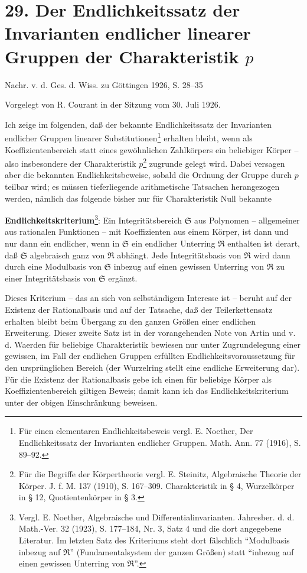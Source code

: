 ﻿\section*{29. Der Endlichkeitssatz der Invarianten endlicher linearer Gruppen der Charakteristik $p$}

\begin{center}
Nachr. v. d. Ges. d. Wiss. zu Göttingen 1926, S. 28--35
\end{center}

Vorgelegt von R. Courant in der Sitzung vom 30. Juli 1926.

Ich zeige im folgenden, daß der bekannte Endlichkeitssatz der Invarianten endlicher Gruppen linearer Substitutionen\footnote{Für einen elementaren Endlichkeitsbeweis vergl. E. Noether, Der Endlichkeitssatz der Invarianten endlicher Gruppen. Math. Ann. 77 (1916), S. 89--92.} erhalten bleibt, wenn als Koeffizientenbereich statt eines gewöhnlichen Zahlkörpers ein beliebiger Körper -- also insbesondere der Charakteristik $p$\footnote{Für die Begriffe der Körpertheorie vergl. E. Steinitz, Algebraische Theorie der Körper. J. f. M. 137 (1910), S. 167--309. Charakteristik in § 4, Wurzelkörper in § 12, Quotientenkörper in § 3.} zugrunde gelegt wird. Dabei versagen aber die bekannten Endlichkeitsbeweise, sobald die Ordnung der Gruppe durch $p$ teilbar wird; es müssen tieferliegende arithmetische Tatsachen herangezogen werden, nämlich das folgende bisher nur für Charakteristik Null bekannte

\textbf{Endlichkeitskriterium}\footnote{Vergl. E. Noether, Algebraische und Differentialinvarianten. Jahresber. d. d. Math.-Ver. 32 (1923), S. 177--184, Nr. 3, Satz 4 und die dort angegebene Literatur. Im letzten Satz des Kriteriums steht dort fälschlich ``Modulbasis inbezug auf $\mathfrak R$'' (Fundamentalsystem der ganzen Größen) statt ``inbezug auf einen gewissen Unterring von $\mathfrak R$''.}: Ein Integritätsbereich $\mathfrak S$ aus Polynomen -- allgemeiner aus rationalen Funktionen -- mit Koeffizienten aus einem Körper, ist dann und nur dann ein endlicher, wenn in $\mathfrak S$ ein endlicher Unterring $\mathfrak R$ enthalten ist derart, daß $\mathfrak S$ algebraisch ganz von $\mathfrak R$ abhängt. Jede Integritätsbasis von $\mathfrak R$ wird dann durch eine Modulbasis von $\mathfrak S$ inbezug auf einen gewissen Unterring von $\mathfrak R$ zu einer Integritätsbasis von $\mathfrak S$ ergänzt.

Dieses Kriterium -- das an sich von selbständigem Interesse ist -- beruht auf der Existenz der Rationalbasis und auf der Tatsache, daß der Teilerkettensatz erhalten bleibt beim Übergang zu den ganzen Größen einer endlichen Erweiterung. Dieser zweite Satz ist in der vorangehenden Note von Artin und v. d. Waerden für beliebige Charakteristik bewiesen nur unter Zugrundelegung einer gewissen, im Fall der endlichen Gruppen erfüllten Endlichkeitsvoraussetzung für den ursprünglichen Bereich (der Wurzelring stellt eine endliche Erweiterung dar). Für die Existenz der Rationalbasis gebe ich einen für beliebige Körper als Koeffizientenbereich giltigen Beweis; damit kann ich das Endlichkeitskriterium unter der obigen Einschränkung beweisen.

